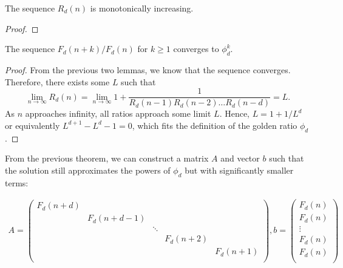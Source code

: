 \documentclass[english,version-2020-11]{uzl-thesis}
\begin{document}
\begin{lemma}
  The sequence $R_d(n)$ is monotonically increasing.
\end{lemma}

\begin{proof}

\end{proof}

\begin{theorem}
  The sequence $F_d(n + k) / F_d(n)$ for $k \ge 1$ converges to $\phi_d^k$.
\end{theorem}

\begin{proof}
  From the previous two lemmas, we know that the sequence converges.
  Therefore, there exists some $L$ such that
  \[
    \lim_{n \to \infty} R_d(n) = \lim_{n \to \infty} 1 + \frac{1}{R_d(n-1) R_d(n-2) \dots R_d(n-d)} = L.
  \]
  As $n$ approaches infinity, all ratios approach some limit $L$.
  Hence, $L = 1 + 1/L^d$ or equivalently $L^{d+1} - L^d - 1 = 0$,
  which fits the definition of the golden ratio $\phi_d$.
\end{proof}

From the previous theorem, we can construct a matrix $A$ and vector $b$ such that the solution
still approximates the powers of $\phi_d$ but with significantly smaller terms:

\begin{align*}
  A = \begin{pmatrix}
    F_d(n + d) \\
    & F_d(n + d - 1) \\
    && \ddots \\
    &&& F_d(n + 2) \\
    &&&& F_d(n + 1) \\
  \end{pmatrix},
  b =
  \begin{pmatrix}
    F_d(n) \\
    F_d(n) \\
    \vdots \\
    F_d(n) \\
    F_d(n) \\
  \end{pmatrix}
\end{align*}
\end{document}

